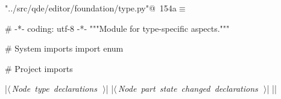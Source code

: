 \documentclass[%
    a4paper,    %
    justified,  %
    nobib,      %
    openany     %
]{tufte-book}
\begin{document}
\begin{flushleft} \small
\begin{minipage}{\linewidth}\label{scrap178}\raggedright\small
{} \verb@"../src/qde/editor/foundation/type.py"@\nobreak\ {\footnotesize {154a}}$\equiv$
\vspace{-1ex}
\begin{pythoncode}
# -*- coding: utf-8 -*-
"""Module for type-specific aspects."""

# System imports
import enum

# Project imports


|\hbox{$\langle\,${\itshape Node type declarations}\nobreak\ {\footnotesize {}}$\,\rangle$}|
|\hbox{$\langle\,${\itshape Node part state changed declarations}\nobreak\ {\footnotesize {}}$\,\rangle$}|
|\NWsep|
\end{pythoncode}
\vspace{1.5ex}
\footnotesize
\begin{list}{}{\setlength{\itemsep}{-\parsep}\setlength{\itemindent}{-\leftmargin}}

\item{}
\end{list}
\end{minipage}\vspace{4ex}
\end{flushleft}
\end{document}

